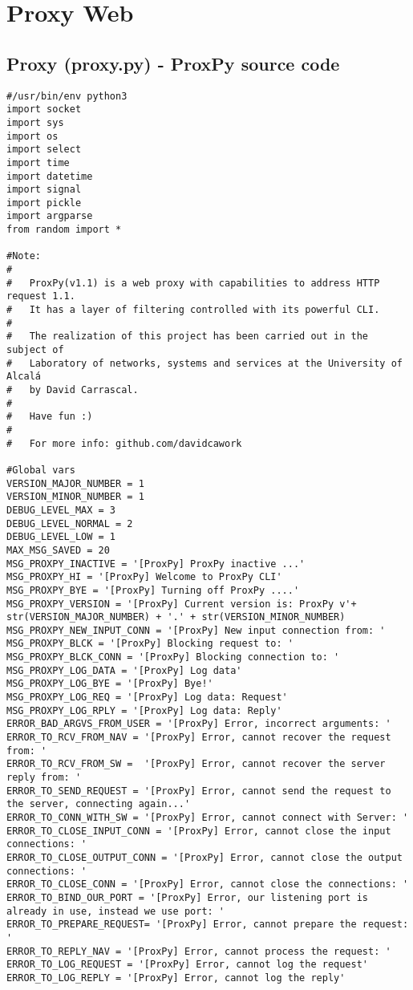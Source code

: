 \chapter{Proxy Web}
\section{Proxy (proxy.py) - ProxPy source code}
\begin{verbatim}
#/usr/bin/env python3
import socket           
import sys
import os
import select
import time
import datetime
import signal
import pickle
import argparse
from random import *

#Note: 
#
#   ProxPy(v1.1) is a web proxy with capabilities to address HTTP request 1.1.
#   It has a layer of filtering controlled with its powerful CLI.
#   
#   The realization of this project has been carried out in the subject of 
#   Laboratory of networks, systems and services at the University of Alcalá
#   by David Carrascal.
#
#   Have fun :) 
#
#   For more info: github.com/davidcawork

#Global vars
VERSION_MAJOR_NUMBER = 1
VERSION_MINOR_NUMBER = 1
DEBUG_LEVEL_MAX = 3
DEBUG_LEVEL_NORMAL = 2
DEBUG_LEVEL_LOW = 1
MAX_MSG_SAVED = 20
MSG_PROXPY_INACTIVE = '[ProxPy] ProxPy inactive ...'
MSG_PROXPY_HI = '[ProxPy] Welcome to ProxPy CLI'
MSG_PROXPY_BYE = '[ProxPy] Turning off ProxPy ....'
MSG_PROXPY_VERSION = '[ProxPy] Current version is: ProxPy v'+ str(VERSION_MAJOR_NUMBER) + '.' + str(VERSION_MINOR_NUMBER)
MSG_PROXPY_NEW_INPUT_CONN = '[ProxPy] New input connection from: '
MSG_PROXPY_BLCK = '[ProxPy] Blocking request to: '
MSG_PROXPY_BLCK_CONN = '[ProxPy] Blocking connection to: '
MSG_PROXPY_LOG_DATA = '[ProxPy] Log data'
MSG_PROXPY_LOG_BYE = '[ProxPy] Bye!'
MSG_PROXPY_LOG_REQ = '[ProxPy] Log data: Request'
MSG_PROXPY_LOG_RPLY = '[ProxPy] Log data: Reply'
ERROR_BAD_ARGVS_FROM_USER = '[ProxPy] Error, incorrect arguments: '
ERROR_TO_RCV_FROM_NAV = '[ProxPy] Error, cannot recover the request from: '
ERROR_TO_RCV_FROM_SW =  '[ProxPy] Error, cannot recover the server reply from: '
ERROR_TO_SEND_REQUEST = '[ProxPy] Error, cannot send the request to the server, connecting again...'
ERROR_TO_CONN_WITH_SW = '[ProxPy] Error, cannot connect with Server: '
ERROR_TO_CLOSE_INPUT_CONN = '[ProxPy] Error, cannot close the input connections: '
ERROR_TO_CLOSE_OUTPUT_CONN = '[ProxPy] Error, cannot close the output connections: '
ERROR_TO_CLOSE_CONN = '[ProxPy] Error, cannot close the connections: '
ERROR_TO_BIND_OUR_PORT = '[ProxPy] Error, our listening port is already in use, instead we use port: '
ERROR_TO_PREPARE_REQUEST= '[ProxPy] Error, cannot prepare the request: '
ERROR_TO_REPLY_NAV = '[ProxPy] Error, cannot process the request: '
ERROR_TO_LOG_REQUEST = '[ProxPy] Error, cannot log the request'
ERROR_TO_LOG_REPLY = '[ProxPy] Error, cannot log the reply'


\end{verbatim}
